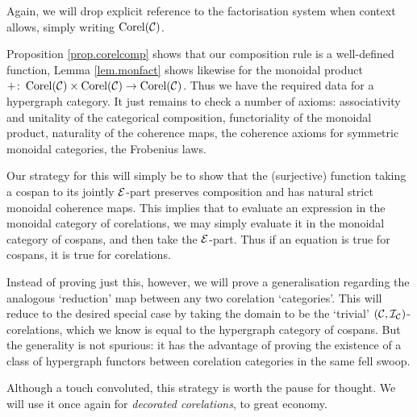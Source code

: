 Again, we will drop explicit reference to the factorisation system when context allows, simply writing $\mathrm{Corel}(\mathcal C)$.

Proposition \ref{prop.corelcomp} shows that our composition rule is a
well-defined function, Lemma \ref{lem.monfact} shows likewise for the monoidal
product $+{\colon} \operatorname{{Corel}}(\mathcal C)\times \operatorname{{Corel}}(\mathcal C) \to \operatorname{{Corel}}(\mathcal C)$. Thus we
have the required data for a hypergraph category. It just remains to check a
number of axioms: associativity and unitality of the categorical composition,
functoriality of the monoidal product, naturality of the coherence maps, the
coherence axioms for symmetric monoidal categories, the Frobenius laws.

Our strategy for this will simply be to show that the (surjective) function
taking a cospan to its jointly $\mathcal E$-part preserves composition and has
natural strict monoidal coherence maps. This implies that to evaluate an
expression in the monoidal category of corelations, we may simply evaluate it in
the monoidal category of cospans, and then take the $\mathcal E$-part. Thus if an
equation is true for cospans, it is true for corelations.

Instead of proving just this, however, we will prove a generalisation regarding
the analogous `reduction' map between any two corelation `categories'. This will
reduce to the desired special case by taking the domain to be the `trivial'
$(\mathcal C,\mathcal I_{\mathcal C})$-corelations, which we know is equal to the hypergraph
category of cospans. But the generality is not spurious: it has the advantage of
proving the existence of a class of hypergraph functors between corelation
categories in the same fell swoop.

Although a touch convoluted, this strategy is worth the pause for thought. We
will use it once again for \emph{decorated corelations}, to great economy.

